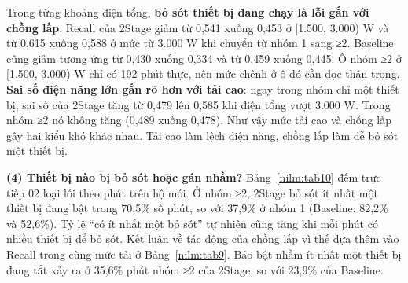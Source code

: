 Trong từng khoảng điện tổng, \textbf{bỏ sót thiết bị đang chạy là lỗi gắn với chồng lấp}. Recall của 2Stage giảm từ 0,541 xuống 0,453 ở [1.500, 3.000) W và từ 0,615 xuống 0,588 ở mức từ 3.000 W khi chuyển từ nhóm 1 sang ≥2. Baseline cũng giảm tương ứng từ 0,430 xuống 0,334 và từ 0,459 xuống 0,445. Ô nhóm ≥2 ở [1.500, 3.000) W chỉ có 192 phút thực, nên mức chênh ở ô đó cần đọc thận trọng. \textbf{Sai số điện năng lớn gắn rõ hơn với tải cao}: ngay trong nhóm chỉ một thiết bị, sai số của 2Stage tăng từ 0,479 lên 0,585 khi điện tổng vượt 3.000 W. Trong nhóm ≥2 nó không tăng (0,489 xuống 0,478). Như vậy mức tải cao và chồng lấp gây hai kiểu khó khác nhau. Tải cao làm lệch điện năng, chồng lấp làm dễ bỏ sót một thiết bị.

\textbf{(4) Thiết bị nào bị bỏ sót hoặc gán nhầm?} Bảng~\ref{nilm:tab10} đếm trực tiếp 02 loại lỗi theo phút trên hộ mới. Ở nhóm ≥2, 2Stage bỏ sót ít nhất một thiết bị đang bật trong 70,5\% số phút, so với 37,9\% ở nhóm 1 (Baseline: 82,2\% và 52,6\%). Tỷ lệ “có ít nhất một bỏ sót” tự nhiên cũng tăng khi mỗi phút có nhiều thiết bị để bỏ sót. Kết luận về tác động của chồng lấp vì thế dựa thêm vào Recall trong cùng mức tải ở Bảng~\ref{nilm:tab9}. Báo bật nhầm ít nhất một thiết bị đang tắt xảy ra ở 35,6\% phút nhóm ≥2 của 2Stage, so với 23,9\% của Baseline.


